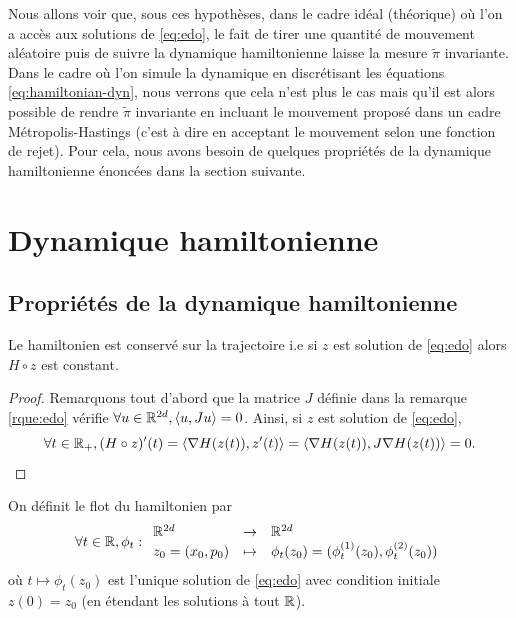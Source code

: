 \documentclass[10pt,a4paper]{article}
\begin{document}
Nous allons voir que, sous ces hypothèses, dans le cadre idéal (théorique) où l'on a accès aux solutions de \eqref{eq:edo}, le fait de tirer une quantité de mouvement aléatoire puis de suivre la dynamique hamiltonienne laisse la mesure $\tilde{\pi}$ invariante. Dans le cadre où l'on simule la dynamique en discrétisant les équations \eqref{eq:hamiltonian-dyn}, nous verrons que cela n'est plus le cas mais qu'il est alors possible de rendre $\tilde{\pi}$ invariante en incluant le mouvement proposé dans un cadre Métropolis-Hastings (c'est à dire en acceptant le mouvement selon une fonction de rejet). Pour cela, nous avons besoin de quelques propriétés de la dynamique hamiltonienne énoncées dans la section suivante.



\section{Dynamique hamiltonienne}

\subsection{Propriétés de la dynamique hamiltonienne}
\begin{Prop}\label{prop:conservation}
	Le hamiltonien est conservé sur la trajectoire i.e si $z$ est solution de \eqref{eq:edo} alors $H \circ z$ est constant.
\end{Prop}

\begin{proof}
	Remarquons tout d'abord que la matrice $J$ définie dans la remarque \ref{rque:edo} vérifie $\forall u \in \mathbb{R}^{2d}, { \left\langle u, Ju \right\rangle} = 0$. Ainsi, si $z$ est solution de \eqref{eq:edo},
	$$
	\forall t \in \mathbb{R}_+, (H \circ z)'(t) = { \left\langle \nabla H (z(t)), z'(t) \right\rangle} = { \left\langle \nabla H (z(t)), J \nabla H(z(t)) \right\rangle} = 0.
	$$
\end{proof}

\begin{Def}
	On définit le flot du hamiltonien par
	$$
	\forall t \in \mathbb{R}, \phi_t : { \begin{array}{lcl} 
		\mathbb{R}^{2d} & \to & \mathbb{R}^{2d} \\
		z_0 = (x_0, p_0) &\mapsto & \phi_t(z_0) = (\phi_t^{(1)}(z_0), \phi_t^{(2)}(z_0))
	 \end{array} }
	$$
	où $t \mapsto \phi_t(z_0)$ est l'unique solution de \eqref{eq:edo} avec condition initiale $z(0) = z_0$ (en étendant les solutions à tout $\mathbb{R}$).
\end{Def}
\end{document}
